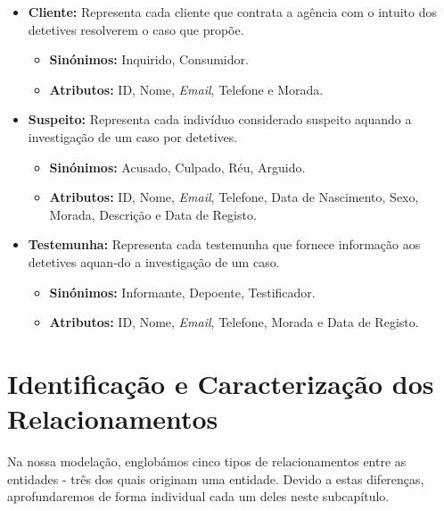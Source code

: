 \documentclass[a4paper,12pt]{scrreprt}
\begin{document}
\begin{itemize}
        \item \textbf{Cliente:} Representa cada cliente que contrata a agência com o intuito dos detetives resolverem o caso que propõe.
            \begin{itemize}
            \item\textbf{Sinónimos:} Inquirido, Consumidor.
            \item\textbf{Atributos:} ID, Nome, \textit{Email}, Telefone e Morada. 
            \end{itemize}

        \clearpage

        \item \textbf{Suspeito:} Representa cada indivíduo considerado suspeito aquando a investigação de um caso por detetives.
            \begin{itemize}
            \item\textbf{Sinónimos:} Acusado, Culpado, Réu, Arguido. 
            \item\textbf{Atributos:} ID, Nome, \textit{Email}, Telefone, Data de Nascimento, Sexo, Morada, Descrição e Data de Registo.
            \end{itemize}

        \item \textbf{Testemunha:} Representa cada testemunha que fornece informação aos detetives aquan-do a investigação de um caso.
            \begin{itemize}
            \item\textbf{Sinónimos:} Informante, Depoente, Testificador.
            \item\textbf{Atributos:} ID, Nome, \textit{Email}, Telefone, Morada e Data de Registo.
            \end{itemize}
        \end{itemize}

\pagebreak
    \section{Identificação e Caracterização dos Relacionamentos}
        Na nossa modelação, englobámos cinco tipos de relacionamentos entre as entidades - três dos quais originam uma entidade. Devido a estas diferenças, aprofundaremos de forma individual cada um deles neste subcapítulo.

        \vspace{0.5cm}
\end{document}
